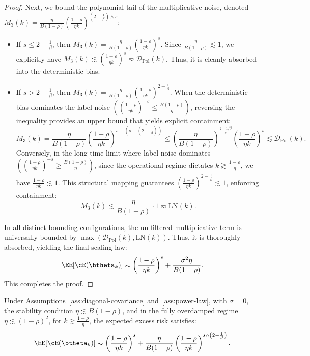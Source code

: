 \begin{proof}
Next, we bound the polynomial tail of the multiplicative noise, denoted $M_3(k) = \frac{\eta}{B(1-\rho)} \left(\frac{1-\rho}{\eta k}\right)^{\left(2-\frac1\beta\right)\wedge s}$:
\begin{itemize}
    \item If $s \le 2-\frac{1}{\beta}$, then $M_3(k) = \frac{\eta}{B(1-\rho)} \left(\frac{1-\rho}{\eta k}\right)^s$. Since $\frac{\eta}{B(1-\rho)} \lesssim 1$, we explicitly have $M_3(k) \lesssim \left(\frac{1-\rho}{\eta k}\right)^s \eqsim \mathcal{D}_{\mathrm{Pol}}(k)$. Thus, it is cleanly absorbed into the deterministic bias.
    \item If $s > 2-\frac{1}{\beta}$, then $M_3(k) = \frac{\eta}{B(1-\rho)} \left(\frac{1-\rho}{\eta k}\right)^{2-\frac{1}{\beta}}$.
    When the deterministic bias dominates the label noise $\left( \left(\frac{1-\rho}{\eta k}\right)^{-s} \le \frac{B(1-\rho)}{\eta} \right)$, reversing the inequality provides an upper bound that yields explicit containment:
    \[
        M_3(k) = \frac{\eta}{B(1-\rho)} \left(\frac{1-\rho}{\eta k}\right)^{s-\left(s-\left(2-\frac{1}{\beta}\right)\right)} \le \left(\frac{\eta}{B(1-\rho)}\right)^{\frac{2-1/\beta}{s}} \left(\frac{1-\rho}{\eta k}\right)^s \lesssim \mathcal{D}_{\mathrm{Pol}}(k).
    \]
    Conversely, in the long-time limit where label noise dominates $\left( \left(\frac{1-\rho}{\eta k}\right)^{-s} \ge \frac{B(1-\rho)}{\eta} \right)$, since the operational regime dictates $k \gtrsim \frac{1-\rho}{\eta}$, we have $\frac{1-\rho}{\eta k} \lesssim 1$. This structural mapping guarantees $\left(\frac{1-\rho}{\eta k}\right)^{2-\frac{1}{\beta}} \lesssim 1$, enforcing containment:
    \[
        M_3(k) \lesssim \frac{\eta}{B(1-\rho)} \cdot 1 \eqsim \text{LN}(k).
    \]
\end{itemize}
In all distinct bounding configurations, the un-filtered multiplicative term is universally bounded by $\max(\mathcal{D}_{\mathrm{Pol}}(k), \text{LN}(k))$. Thus, it is thoroughly absorbed, yielding the final scaling law:
\[
    \EE[\cE(\btheta_k)]
    \eqsim
    \left(\frac{1-\rho}{\eta k}\right)^s
    +
    \frac{\sigma^2\eta}{B(1-\rho)}.
\]
This completes the proof.
\end{proof}

\begin{theorem}
\label{thm:pol_scaling_sgd_noiseless}
Under Assumptions~\ref{ass:diagonal-covariance} and~\ref{ass:power-law}, with \(\sigma=0\), the stability condition \(\eta \lesssim B(1-\rho)\), and in the fully overdamped regime \(\eta\lesssim(1-\rho)^2\), for \(k \gtrsim \frac{1-\rho}{\eta}\), the expected excess risk satisfies:
\begin{equation}
\label{eq:pol_scaling_sgd_noiseless}
    \EE[\cE(\btheta_k)]
    \eqsim
    \left(\frac{1-\rho}{\eta k}\right)^s
    +
    \frac{\eta}{B(1-\rho)}
    \left(\frac{1-\rho}{\eta k}\right)^{s \wedge \left(2-\frac1\beta\right)}.
\end{equation}
\end{theorem}

